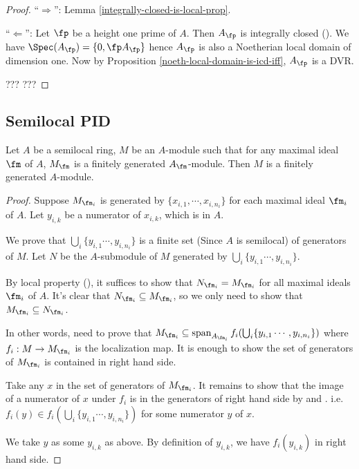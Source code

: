 \begin{proof}
``$\Rightarrow$'': Lemma \ref{integrally-closed-is-local-prop}.

``$\Leftarrow$'': Let $\fp$ be a height one prime of $A$.
Then $A_\fp$ is integrally closed ().
We have $\Spec(A_\fp)=\{0,\fp A_\fp\}$ hence
$A_\fp$ is also a Noetherian local domain of dimension one.
Now by Proposition \ref{noeth-local-domain-is-icd-iff}, $A_\fp$ is a DVR.

??? ???
\end{proof}

\subsection{Semilocal PID}

\begin{lem}
\label{semilocal-fg-mod}
\leanok
Let $A$ be a semilocal ring, $M$ be an $A$-module such that
for any maximal ideal $\fm$ of $A$, $M_\fm$ is a finitely generated $A_\fm$-module.
Then $M$ is a finitely generated $A$-module.
\end{lem}

\begin{proof}
\leanok
Suppose $M_{\fm_i}$ is generated by $\{x_{i,1},\cdots, x_{i,n_i}\}$ for each maximal ideal $\fm_i$ of $A$.
Let $y_{i,k}$ be a numerator of $x_{i,k}$, which is in $A$.

We prove that $\bigcup_{i}\{y_{i,1} \cdots, y_{i,n_i}\}$
is a finite set (Since $A$ is semilocal) of generators of $M$.
Let $N$ be the $A$-submodule of $M$ generated by $\bigcup_{i}\{y_{i,1} \cdots, y_{i,n_i}\}$.

By local property (), it suffices to show that
$N_{\fm_{i}} = M_{\fm_{i}}$ for all maximal ideals $\fm_i$ of $A$.
It's clear that $N_{\fm_{i}} \subseteq  M_{\fm_{i}}$, so we only need to show that $M_{\fm_{i}} \subseteq  N_{\fm_{i}}$.

In other words, need to prove that $M_{\fm_{i}} \subseteq
\operatorname{span}_{A_{\fm_i}} f_i (\bigcup_{i}\{y_{i,1} \cdots, y_{i,n_i}\})$
where $f_i : M \to M_{\fm_i}$ is the localization map.
It is enough to show the set of generators of $M_{\fm_{i}}$ is contained in right hand side.

Take any $x$ in the set of generators of $M_{\fm_{i}}$.
It remains to show that the image of a numerator of $x$ under $f_i$
is in the generators of right hand side by
 and .
i.e. $f_i(y) \in f_i (\bigcup_{i}\{y_{i,1} \cdots, y_{i,n_i}\})$
for some numerator $y$ of $x$.

We take $y$ as some $y_{i,k}$ as above.
By definition of $y_{i,k}$, we have $f_i(y_{i,k})$ in right hand side.
\end{proof}

